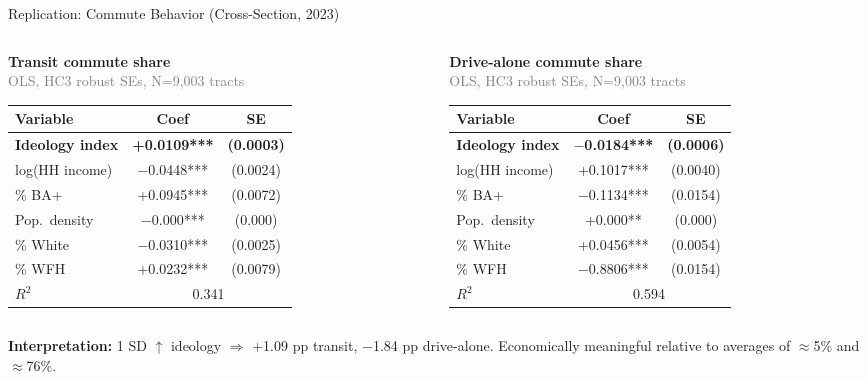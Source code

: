 \documentclass[aspectratio=169,t]{beamer}
\newcommand{\sig}[1]{\textbf{#1}}
\newcommand{\src}[1]{\footnotesize\textcolor{gray}{#1}}
\begin{document}
\begin{frame}{Replication: Commute Behavior (Cross-Section, 2023)}
  \begin{columns}[T]
    \begin{column}{0.48\textwidth}
      \textbf{Transit commute share}\\
      \src{OLS, HC3 robust SEs, N=9,003 tracts}

      \vspace{0.3em}
      \begin{tabular}{lcc}
        \toprule
        \textbf{Variable} & \textbf{Coef} & \textbf{SE} \\
        \midrule
        \sig{Ideology index} & \sig{+0.0109***} & \sig{(0.0003)} \\
        log(HH income) & $-$0.0448*** & (0.0024) \\
        \% BA+ & +0.0945*** & (0.0072) \\
        Pop.\ density & $-$0.000*** & (0.000) \\
        \% White & $-$0.0310*** & (0.0025) \\
        \% WFH & +0.0232*** & (0.0079) \\
        \midrule
        $R^2$ & \multicolumn{2}{c}{0.341} \\
        \bottomrule
      \end{tabular}
    \end{column}
    \begin{column}{0.48\textwidth}
      \textbf{Drive-alone commute share}\\
      \src{OLS, HC3 robust SEs, N=9,003 tracts}

      \vspace{0.3em}
      \begin{tabular}{lcc}
        \toprule
        \textbf{Variable} & \textbf{Coef} & \textbf{SE} \\
        \midrule
        \sig{Ideology index} & \sig{$-$0.0184***} & \sig{(0.0006)} \\
        log(HH income) & +0.1017*** & (0.0040) \\
        \% BA+ & $-$0.1134*** & (0.0154) \\
        Pop.\ density & +0.000** & (0.000) \\
        \% White & +0.0456*** & (0.0054) \\
        \% WFH & $-$0.8806*** & (0.0154) \\
        \midrule
        $R^2$ & \multicolumn{2}{c}{0.594} \\
        \bottomrule
      \end{tabular}
    \end{column}
  \end{columns}
  \vspace{0.4em}
  \textbf{Interpretation:} 1 SD $\uparrow$ ideology $\Rightarrow$ +1.09 pp transit, $-$1.84 pp drive-alone.
  Economically meaningful relative to averages of $\approx$5\% and $\approx$76\%.
\end{frame}
\end{document}
